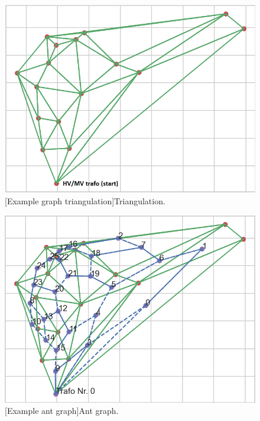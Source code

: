 \begin{figure}
	\centering
	\begin{minipage}{.5\textwidth}
		\centering
		\includegraphics[width=.9\linewidth]{figures/experiments/1000_iter/tri_1000.png}
		[Example graph triangulation]{Triangulation.}
		\label{fig:tri_1000}
	\end{minipage}%
	\begin{minipage}{.5\textwidth}
		\centering
		\includegraphics[width=.9\linewidth]{figures/experiments/1000_iter/tri_ant_1000.png}
		[Example ant graph]{Ant graph.}
		\label{fig:tri_ant_1000}
	\end{minipage}
\end{figure}


